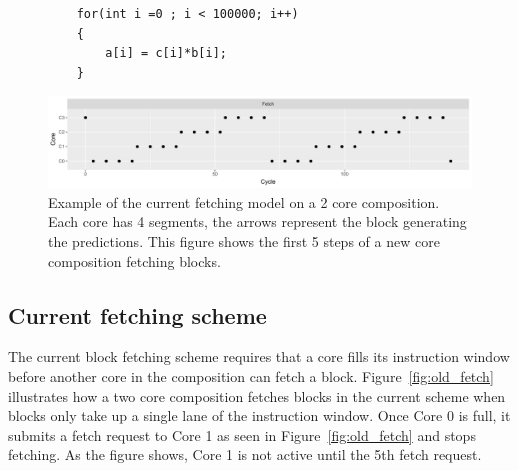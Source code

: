 

\begin{figure}[t]
\lstset{language=C,numbersep=4pt}
\begin{center}
\begin{lstlisting}
	for(int i =0 ; i < 100000; i++)
	{
		a[i] = c[i]*b[i];
	}
\end{lstlisting}
\end{center}
\vspace{-1em}
\label{lst:basic}
\end{figure}

\begin{figure}[t]
    \centering
    \includegraphics[width=1\textwidth]{chapter3/graphics/4fetchnorm.pdf}
    \caption{Example of the current fetching model on a 2 core composition. Each core has 4 segments, the arrows represent the block generating the predictions. This figure shows the first 5 steps of a new core composition fetching blocks.}
    \label{fig:fetch_norm}
\vspace{1em}
\end{figure}


\subsection{Current fetching scheme}
	
The current block fetching scheme requires that a core fills its instruction window before another core in the composition can fetch a block.
Figure~\ref{fig:old_fetch} illustrates how a two core composition fetches blocks in the current scheme when blocks only take up a single lane of the instruction window.
Once Core 0 is full, it submits a fetch request to Core 1 as seen in Figure~\ref{fig:old_fetch} and stops fetching.
As the figure shows, Core 1 is not active until the 5th fetch request.

